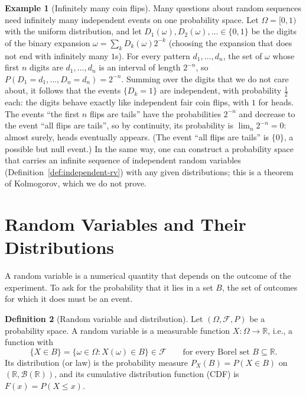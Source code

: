 \documentclass[11pt]{article}
\theoremstyle{definition}
\newtheorem{definition}{Definition}[section]
\newtheorem{example}[definition]{Example}
\theoremstyle{plain}
\theoremstyle{remark}
\begin{document}
\begin{example}[Infinitely many coin flips]\label{ex:coin-flips}
    Many questions about random sequences need infinitely many independent events on one probability space. Let $\Omega = [0, 1)$ with the uniform distribution, and let $D_1(\omega), D_2(\omega), \ldots \in \{0, 1\}$ be the digits of the binary expansion $\omega = \sum_k D_k(\omega)2^{-k}$ (choosing the expansion that does not end with infinitely many $1$s). For every pattern $d_1, \ldots, d_n$, the set of $\omega$ whose first $n$ digits are $d_1, \ldots, d_n$ is an interval of length $2^{-n}$, so $P(D_1 = d_1, \ldots, D_n = d_n) = 2^{-n}$. Summing over the digits that we do not care about, it follows that the events $\{D_k = 1\}$ are independent, with probability $\frac{1}{2}$ each: the digits behave exactly like independent fair coin flips, with $1$ for heads. The events ``the first $n$ flips are tails'' have the probabilities $2^{-n}$ and decrease to the event ``all flips are tails'', so by continuity, its probability is $\lim_n 2^{-n} = 0$: almost surely, heads eventually appears. (The event ``all flips are tails'' is $\{0\}$, a possible but null event.) In the same way, one can construct a probability space that carries an infinite sequence of independent random variables (Definition~\ref{def:independent-rv}) with any given distributions; this is a theorem of Kolmogorov, which we do not prove.
\end{example}

\section{Random Variables and Their Distributions}\label{sec:random-variables}

A random variable is a numerical quantity that depends on the outcome of the experiment. To ask for the probability that it lies in a set $B$, the set of outcomes for which it does must be an event.

\begin{definition}[Random variable and distribution]\label{def:random-variable}
    Let $(\Omega, \mathcal{F}, P)$ be a probability space. A random variable is a measurable function $X: \Omega \to \mathbb{R}$, i.e., a function with
    \[\{X \in B\} = \{\omega \in \Omega : X(\omega) \in B\} \in \mathcal{F} \qquad \text{for every Borel set } B \subseteq \mathbb{R}.\]
    Its distribution (or law) is the probability measure $P_X(B) = P(X \in B)$ on $(\mathbb{R}, \mathcal{B}(\mathbb{R}))$, and its cumulative distribution function (CDF) is $F(x) = P(X \leq x)$.
\end{definition}
\end{document}
